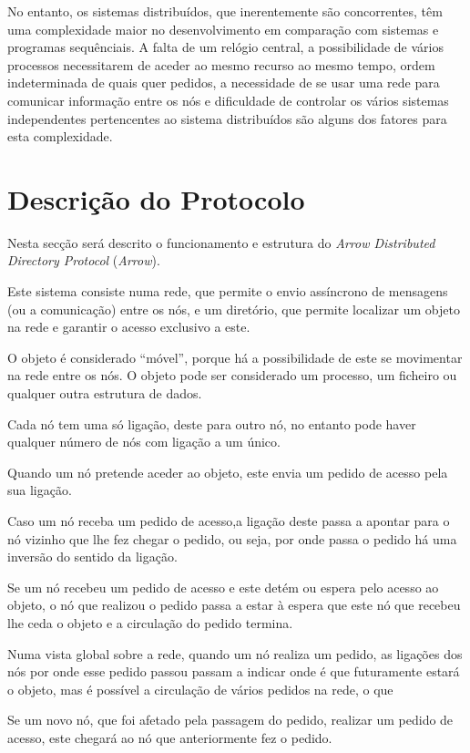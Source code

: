 No entanto, os sistemas distribuídos, que inerentemente são concorrentes, têm uma complexidade maior no desenvolvimento em comparação com sistemas e programas sequênciais.
A falta de um relógio central, a possibilidade de vários processos necessitarem de aceder ao mesmo recurso ao mesmo tempo, ordem indeterminada de quais quer pedidos, a necessidade de se usar uma rede para comunicar informação entre os nós e dificuldade de controlar os vários sistemas independentes pertencentes ao sistema distribuídos são alguns dos fatores para esta complexidade.


\section{Descrição do Protocolo}

Nesta secção será descrito o funcionamento e estrutura do \textit{Arrow Distributed Directory Protocol} (\emph{Arrow}). 

Este sistema consiste numa rede, que permite o envio assíncrono de mensagens (ou a comunicação) entre os nós, e um diretório, que permite localizar um objeto na rede e garantir o acesso exclusivo a este. 

O objeto é considerado ``móvel'', porque há a possibilidade de este se movimentar na rede entre os nós.
O objeto pode ser considerado um processo, um ficheiro ou qualquer outra estrutura de dados.

Cada nó tem uma só ligação, deste para outro nó, no entanto pode haver qualquer número de nós com ligação a um único.

Quando um nó pretende aceder ao objeto, este envia um pedido de acesso pela sua ligação. 

Caso um nó receba um pedido de acesso,a ligação deste passa a apontar para o nó vizinho que lhe fez chegar o pedido, ou seja, por onde passa o pedido há uma inversão do sentido da ligação.

Se um nó recebeu um pedido de acesso e este detém ou espera pelo acesso ao objeto, o nó que realizou o pedido passa a estar à espera que este nó que recebeu lhe ceda o objeto e a circulação do pedido termina.


Numa vista global sobre a rede, quando um nó realiza um pedido, as ligações dos nós por onde esse pedido passou passam a indicar onde é que futuramente estará o objeto, mas é possível a circulação de vários pedidos na rede, o que 

Se um novo nó, que foi afetado pela passagem do pedido, realizar um pedido de acesso, este chegará ao nó que anteriormente fez o pedido.

